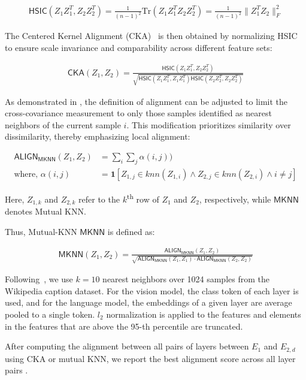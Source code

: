\begin{align}
\mathsf{HSIC}(Z_1Z_1^T,Z_2Z_2^T) = \frac{1}{(n - 1)^2} \text{Tr}(Z_1Z_1^T Z_2Z_2^T) = \frac{1}{(n - 1)^2} \|Z_1^TZ_2\|_F^2
\end{align}

The Centered Kernel Alignment (CKA)~\cite{kornblith_similarity_2019} is then obtained by normalizing HSIC to ensure scale invariance and comparability across different feature sets:

\begin{align}
\mathsf{CKA}(Z_1, Z_2) = \frac{\mathsf{HSIC}(Z_1Z_1^T, Z_2Z_2^T)}{\sqrt{\mathsf{HSIC}(Z_1Z_1^T, Z_1Z_1^T) \mathsf{HSIC}(Z_2Z_2^T, Z_2Z_2^T)}}
\end{align}

As demonstrated in \cite{huh_platonic_2024}, the definition of alignment can be adjusted to limit the cross-covariance measurement to only those samples identified as nearest neighbors of the current sample \(i\). This modification prioritizes similarity over dissimilarity, thereby emphasizing local alignment:

\begin{align}
\mathsf{ALIGN}_{\mathsf{MKNN}}(Z_1,Z_2) &= \sum_i \sum_j \alpha(i, j)) \\
\text{where, }\alpha(i, j) &= \mathbf{1}[Z_{1, j} \in knn(Z_{1, i}) \wedge Z_{2, j} \in knn(Z_{2, i}) \wedge i \neq j]
\end{align}

Here, \(Z_{1, k}\) and \(Z_{2, k}\) refer to the \(k\)\textsuperscript{th} row of \(Z_1\) and \(Z_2\), respectively, while \(\mathsf{MKNN}\) denotes Mutual KNN.

Thus, Mutual-KNN \(\mathsf{MKNN}\) is defined as:

\begin{align}
    \mathsf{MKNN}(Z_1, Z_2) = \frac{\mathsf{ALIGN}_{\mathsf{MKNN}}(Z_1,Z_2)}{\sqrt{\mathsf{ALIGN}_{\mathsf{MKNN}}(Z_1,Z_1) \cdot \mathsf{ALIGN}_{\mathsf{MKNN}}(Z_2,Z_2)}}
\end{align}

Following~\citet{huh_platonic_2024}, we use $k=10$ nearest neighbors over 1024 samples from the Wikipedia caption dataset. For the vision model, the class token of each layer is used, and for the language model, the embeddings of a given layer are average pooled to a single token. $l_2$ normalization is applied to the features and elements in the features that are above the 95-th percentile are truncated.

After computing the alignment between all pairs of layers between \(E_1\) and \(E_{2,d}\) using CKA or mutual KNN, we report the best alignment score across all layer pairs \cite{schrimpf_brain-score_2018}.

